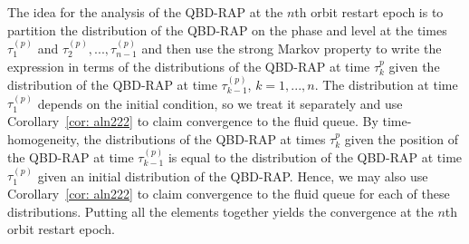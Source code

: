 
The idea for the analysis of the QBD-RAP at the \(n\)th orbit restart epoch is to partition the distribution of the QBD-RAP on the phase and level at the times \(\tau_1^{(p)}\) and \(\tau_2^{(p)},...,\tau_{n-1}^{(p)}\) and then use the strong Markov property to write the expression in terms of the distributions of the QBD-RAP at time \(\tau_k^{p}\) given the distribution of the QBD-RAP at time \(\tau_{k-1}^{(p)}\), \(k=1,...,n\). The distribution at time \(\tau_1^{(p)}\) depends on the initial condition, so we treat it separately and use Corollary~\ref{cor: aln222} to claim convergence to the fluid queue. By time-homogeneity, the distributions of the QBD-RAP at times \(\tau_k^{p}\) given the position of the QBD-RAP at time \(\tau_{k-1}^{(p)}\) is equal to the distribution of the QBD-RAP at time \(\tau_1^{(p)}\) given an initial distribution of the QBD-RAP. Hence, we may also use Corollary~\ref{cor: aln222} to claim convergence to the fluid queue for each of these distributions. Putting all the elements together yields the convergence at the \(n\)th orbit restart epoch.

